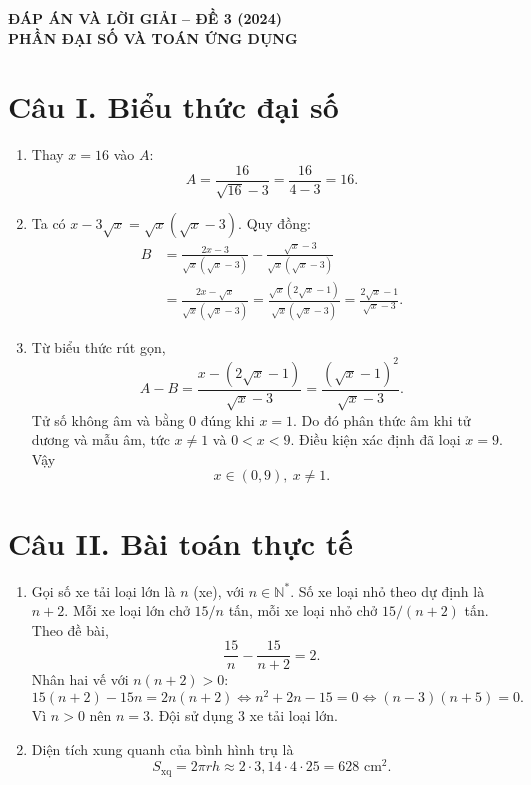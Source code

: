 \documentclass[12pt,a4paper]{article}
\begin{document}
\begin{center}
{\Large\bfseries ĐÁP ÁN VÀ LỜI GIẢI -- ĐỀ 3 (2024)}\\[2pt]
{\large\bfseries PHẦN ĐẠI SỐ VÀ TOÁN ỨNG DỤNG}
\end{center}

\section*{Câu I. Biểu thức đại số}
\begin{enumerate}
\item Thay $x=16$ vào $A$:
\[
A=\frac{16}{\sqrt{16}-3}=\frac{16}{4-3}=16.
\]
\item Ta có $x-3\sqrt{x}=\sqrt{x}(\sqrt{x}-3)$. Quy đồng:
\begin{align*}
B&=\frac{2x-3}{\sqrt{x}(\sqrt{x}-3)}-\frac{\sqrt{x}-3}{\sqrt{x}(\sqrt{x}-3)}\\
&=\frac{2x-\sqrt{x}}{\sqrt{x}(\sqrt{x}-3)}
=\frac{\sqrt{x}(2\sqrt{x}-1)}{\sqrt{x}(\sqrt{x}-3)}
=\frac{2\sqrt{x}-1}{\sqrt{x}-3}.
\end{align*}
\item Từ biểu thức rút gọn,
\[
A-B=\frac{x-(2\sqrt{x}-1)}{\sqrt{x}-3}
=\frac{(\sqrt{x}-1)^2}{\sqrt{x}-3}.
\]
Tử số không âm và bằng 0 đúng khi $x=1$. Do đó phân thức âm khi tử dương và mẫu âm, tức $x\ne1$ và $0<x<9$. Điều kiện xác định đã loại $x=9$. Vậy
\[
\boxed{x\in(0,9),\ x\ne1}.
\]
\end{enumerate}

\section*{Câu II. Bài toán thực tế}
\begin{enumerate}
\item Gọi số xe tải loại lớn là $n$ (xe), với $n\in\mathbb{N}^*$. Số xe loại nhỏ theo dự định là $n+2$. Mỗi xe loại lớn chở $15/n$ tấn, mỗi xe loại nhỏ chở $15/(n+2)$ tấn. Theo đề bài,
\[
\frac{15}{n}-\frac{15}{n+2}=2.
\]
Nhân hai vế với $n(n+2)>0$:
\[
15(n+2)-15n=2n(n+2)
\Longleftrightarrow n^2+2n-15=0
\Longleftrightarrow (n-3)(n+5)=0.
\]
Vì $n>0$ nên $n=3$. Đội sử dụng $\boxed{3}$ xe tải loại lớn.
\item Diện tích xung quanh của bình hình trụ là
\[
S_{\text{xq}}=2\pi rh\approx2\cdot3{,}14\cdot4\cdot25=628\text{ cm}^2.
\]
\end{enumerate}
\end{document}

